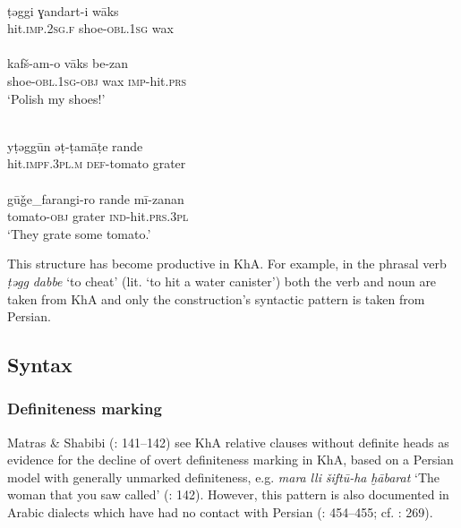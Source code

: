 \documentclass[output=paper,nonflat]{langsci/langscibook}
\begin{document}
\ea\label{ex:key:} \label{taggi}
\\
\gll ṭəggi ɣandart-i wāks\\
     hit.\textsc{imp.2sg.f} shoe-\textsc{obl}.1\textsc{sg} wax\\
 
\\
\gll kafš-am-o vāks be-zan\\
     shoe-\textsc{obl.}1\textsc{sg-obj} wax \textsc{imp-}hit\textsc{.prs}\\
\glt ‘Polish my shoes!’
\z\z

\ea\label{ex:key:} \label{tamate}
\\
\gll yṭəggūn əṭ-ṭamāṭe rande\\
     hit.\textsc{impf.3pl.m} \textsc{def}{}-tomato grater \\
 
\\
\gll gūǧe\_farangi-ro rande mī-zanan\\
     tomato-\textsc{obj} grater \textsc{ind}-hit\textsc{.prs.3pl} \\
\glt ‘They grate some tomato.’
\z\z

This structure has become productive in KhA. For example, in the phrasal verb \textit{ṭəgg} \textit{dabbe} ‘to cheat’ (lit. ‘to hit a water canister’) both the verb and noun are taken from KhA and only the construction’s syntactic pattern is taken from Persian. 

\subsection{Syntax}
\subsubsection{Definiteness marking}

Matras \& Shabibi (\citeyear{MatrasShabibi2007}: 141–142) see KhA relative clauses without definite heads as evidence for the decline of overt definiteness marking in KhA, based on a Persian model with generally unmarked definiteness, e.g. \textit{mara} \textit{lli} \textit{šiftū-ha} \textit{ḫābarat} ‘The woman that you saw called’ (\citeyear{MatrasShabibi2007}: 142). However, this pattern is also documented in Arabic dialects which have had no contact with Persian (\citealt{Pat-El2017}: 454–455; cf. \citealt{Procházka2018Fertile}: 269).
\end{document}
